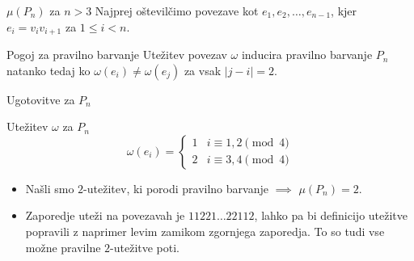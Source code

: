 \documentclass{beamer}
\begin{document}
\begin{frame}{$\mu(P_n)$ za $n > 3$}
	Najprej oštevilčimo povezave kot $e_1, e_2, \ldots, e_{n-1}$, kjer $e_i = v_i v_{i+1}$ za $1 \le i < n$.
	\begin{block}{Pogoj za pravilno barvanje}
		Utežitev povezav $\omega$ inducira pravilno barvanje $P_n$ natanko tedaj ko $\omega(e_i) \neq \omega(e_j)$ za vsak $|j -i| = 2$.
	\end{block}
\begin{figure}[!h]
	\centering
	\label{fig:pn}

\end{figure}
\end{frame}

\begin{frame}{Ugotovitve za $P_n$}
	\begin{block}{Utežitev $\omega$ za $P_n$}
		$$
		\omega(e_i) = \begin{cases}
			1 &i \equiv 1,2 \pmod{4}\\ 
			2 &i \equiv 3,4 \pmod{4}
		\end{cases}
		$$
	\end{block}
	\begin{itemize}
		\item Našli smo $2$-utežitev, ki porodi pravilno barvanje $\implies$  $\mu(P_n) = 2$.
		\item Zaporedje uteži na povezavah je $11221\ldots 22112$, lahko pa bi definicijo utežitve popravili z naprimer levim zamikom zgornjega zaporedja. To so tudi vse možne pravilne $2$-utežitve poti.
	\end{itemize}
\end{frame}
\end{document}
